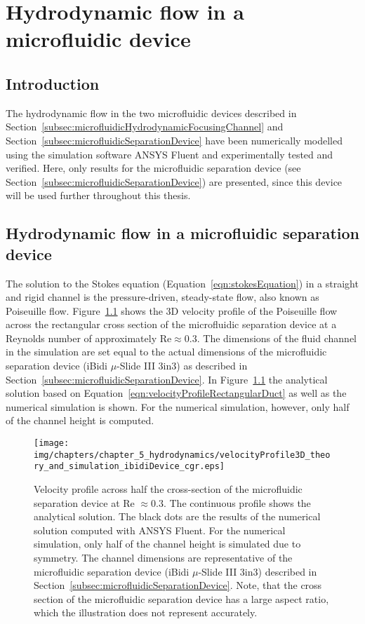 \chapter{Hydrodynamic flow in a microfluidic device}\label{ch:hydrodynamicFlowInAMicrofluidicDevice}

\section{Introduction}
The hydrodynamic flow in the two microfluidic devices described in Section~\ref{subsec:microfluidicHydrodynamicFocusingChannel} and Section~\ref{subsec:microfluidicSeparationDevice} have been numerically modelled using the simulation software ANSYS Fluent and experimentally tested and verified. Here, only results for the microfluidic separation device (see Section~\ref{subsec:microfluidicSeparationDevice}) are presented, since this device will be used further throughout this thesis.

\section{Hydrodynamic flow in a microfluidic separation device}\label{sec:hydrodynamicFlowInAMicrofluidicSseparationDevice}
The solution to the Stokes equation (Equation~\ref{eqn:stokesEquation}) in a straight and rigid channel is the pressure-driven, steady-state flow, also known as Poiseuille flow. Figure~\ref{fig:velocityProfileInMicrofluidicSeparationDevice} shows the 3D velocity profile of the Poiseuille flow across the rectangular cross section of the microfluidic separation device at a Reynolds number of approximately $\text{Re}\approx 0.3$. The dimensions of the fluid channel in the simulation are set equal to the actual dimensions of the microfluidic separation device (iBidi $\mu$-Slide III 3in3) as described in Section~\ref{subsec:microfluidicSeparationDevice}. In Figure~\ref{fig:velocityProfileInMicrofluidicSeparationDevice} the analytical solution based on Equation~\ref{eqn:velocityProfileRectangularDuct} as well as the numerical simulation is shown. For the numerical simulation, however, only half of the channel height is computed.

\begin{figure}[htb]
\centering
   \texttt{[image: img/chapters/chapter\_5\_hydrodynamics/velocityProfile3D\_theory\_and\_simulation\_ibidiDevice\_cgr.eps]}
\caption[Velocity profile across half the cross-section of the microfluidic separation device]{Velocity profile across half the cross-section of the microfluidic separation device at Re $\approx 0.3$. The continuous profile shows the analytical solution. The black dots are the results of the numerical solution computed with ANSYS Fluent. For the numerical simulation, only half of the channel height is simulated due to symmetry. The channel dimensions are representative of the microfluidic separation device (iBidi $\mu$-Slide III 3in3) described in Section~\ref{subsec:microfluidicSeparationDevice}. Note, that the cross section of the microfluidic separation device has a large aspect ratio, which the illustration does not represent accurately.}
\label{fig:velocityProfileInMicrofluidicSeparationDevice}%
\end{figure} 

